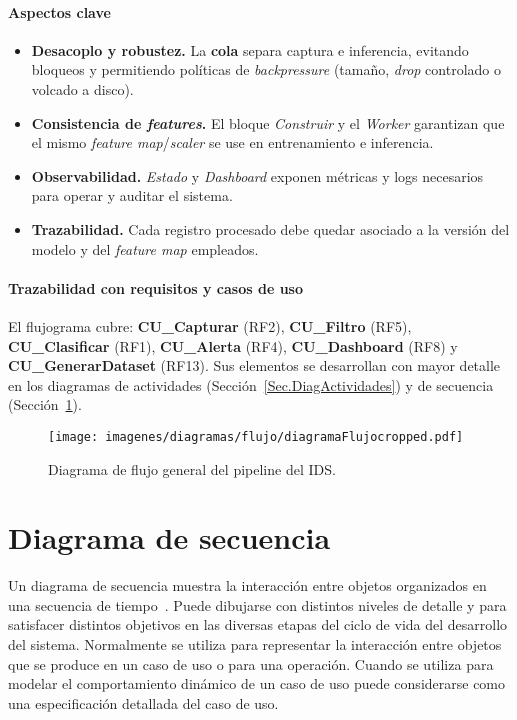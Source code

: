 \paragraph{Aspectos clave}
\begin{itemize}
  \item \textbf{Desacoplo y robustez.} La \textbf{cola} separa captura e inferencia, evitando bloqueos y permitiendo políticas de \emph{backpressure} (tamaño, \emph{drop} controlado o volcado a disco).
  \item \textbf{Consistencia de \emph{features}.} El bloque \emph{Construir} y el \emph{Worker} garantizan que el mismo \emph{feature map}/\emph{scaler} se use en entrenamiento e inferencia.
  \item \textbf{Observabilidad.} \emph{Estado} y \emph{Dashboard} exponen métricas y logs necesarios para operar y auditar el sistema.
  \item \textbf{Trazabilidad.} Cada registro procesado debe quedar asociado a la versión del modelo y del \emph{feature map} empleados.
\end{itemize}

\paragraph{Trazabilidad con requisitos y casos de uso}
El flujograma cubre: \textbf{CU\_Capturar} (RF2), \textbf{CU\_Filtro} (RF5), \textbf{CU\_Clasificar} (RF1), \textbf{CU\_Alerta} (RF4), \textbf{CU\_Dashboard} (RF8) y \textbf{CU\_GenerarDataset} (RF13). Sus elementos se desarrollan con mayor detalle en los diagramas de actividades (Sección~\ref{Sec.DiagActividades}) y de secuencia (Sección~\ref{Sec.DiagSecuencia}).

\begin{figure}[H]
  \centering
  \texttt{[image: imagenes/diagramas/flujo/diagramaFlujocropped.pdf]}
  \caption{Diagrama de flujo general del pipeline del IDS.}
  \label{fig:diagFlujo}
\end{figure}

\section{Diagrama de secuencia}\label{Sec.DiagSecuencia}
Un diagrama de secuencia muestra la interacción entre objetos organizados en
una secuencia de tiempo~\cite{omgUML251}. Puede dibujarse con distintos niveles de detalle y para satisfacer distintos objetivos en las diversas etapas del ciclo de vida del desarrollo del sistema. Normalmente se utiliza para representar la interacción entre objetos que se produce en un caso de uso o para una operación. Cuando se utiliza para modelar el comportamiento dinámico de un caso de uso puede considerarse como una especificación detallada del caso de uso.


